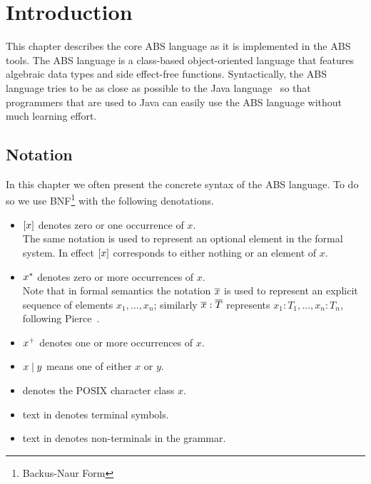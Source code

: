 \chapter{Introduction}
This chapter describes the core ABS language as it is implemented in
the ABS tools.  The ABS language is a class-based object-oriented
language that features algebraic data types and side effect-free
functions.  Syntactically, the ABS language tries to be as close as
possible to the Java language~\cite{gosling96} so that programmers
that are used to Java can easily use the ABS language without much
learning effort.

\section{Notation}
In this chapter we often present the concrete syntax of the ABS language.
To do so we use BNF\footnote{Backus-Naur Form} with the following denotations.
\begin{itemize}
\item $[x]$ denotes zero or one occurrence of $x$. \\
The same notation is used to represent an optional element in the formal system.
In effect $[x]$ corresponds to either nothing or an element of $x$.
\item $x^*$ denotes zero or more occurrences of $x$. \\
Note that in formal semantics the notation $\overline{x}$ is used to
 represent an explicit sequence of elements $x_1,\ldots,x_n$; similarly $\overline{x}:\overline{T}$ represents
$x_1:T_1,\ldots,x_n:T_n$, following Pierce~\cite{Pierce:TypeSystems}.
\item $x^+$ denotes one or more occurrences of $x$.
\item $x \mathrel{|} y$ means one of either $x$ or $y$.
\item {} denotes the POSIX character class $x$. %
\item text in  denotes terminal symbols.
\item text in  denotes non-terminals in the grammar.
\end{itemize}
